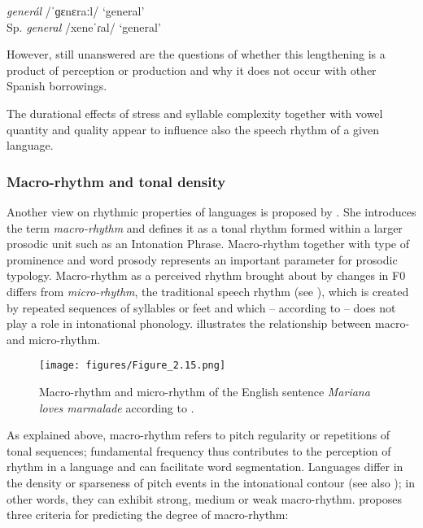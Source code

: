 \ex {}   \textit{generál}   \normalfont/ˈɡɛnɛraːl/   \normalfont‘general’\\
Sp.   \textit{general}   /xeneˈɾal/  ‘general’\\
\z
\z

However, still unanswered are the questions of whether this lengthening is a product of perception or production and why it does not occur with other Spanish borrowings.


The durational effects of stress and syllable complexity together with vowel quantity and quality appear to influence also the speech rhythm of a given language.


\subsubsection{Macro-rhythm and tonal density}\label{sec:2.3.2.3}

Another view on rhythmic properties of languages is proposed by \citet{Jun2014}. She introduces the term \textit{macro-rhythm} and defines it as a tonal rhythm formed within a larger prosodic unit such as an Intonation Phrase. Macro-rhythm together with type of prominence and word prosody represents an important parameter for prosodic typology. Macro-rhythm as a perceived rhythm brought about by changes in F0 differs from \textit{micro-rhythm}, the traditional speech rhythm (see ), which is created by repeated sequences of syllables or feet and which -- according to \citet{Jun2014} -- does not play a role in intonational phonology.  illustrates the relationship between macro- and micro-rhythm.



\begin{figure}
\texttt{[image: figures/Figure\_2.15.png]}
\caption{Macro-rhythm and micro-rhythm of the English sentence \textit{Mariana loves marmalade} according to \citet[524]{Jun2014}.}
\label{fig:2.15}
\end{figure}

As explained above, macro-rhythm refers to pitch regularity or repetitions of tonal sequences; fundamental frequency thus contributes to the perception of rhythm in a language and can facilitate word segmentation. Languages differ in the density or sparseness of pitch events in the intonational contour (see also \citealt{Hellmuth2007, FrotaPrieto2015}); in other words, they can exhibit strong, medium or weak macro-rhythm. \citet[525]{Jun2014} proposes three criteria for predicting the degree of macro-rhythm:

